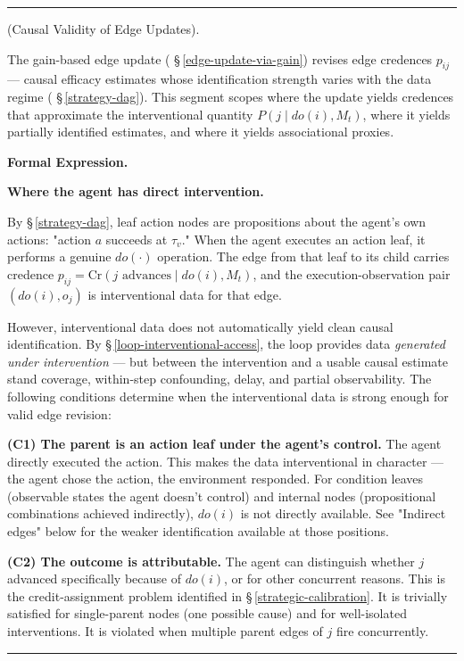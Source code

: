\documentclass[11pt,oneside]{article}
\newcounter{claim}[section]
\renewcommand{\theclaim}{\thesection.\arabic{claim}}
\newenvironment{segment}[2]{%
  \refstepcounter{claim}%
  \bigskip\noindent\hrule\smallskip
  \noindent{\bfseries #1~\theclaim}\enskip(#2).\par\smallskip
  \noindent\ignorespaces
}{%
  \par\smallskip\noindent\hrule\bigskip
}
\newenvironment{scope}[1][]{\begin{segment}{Scope}{#1}}{\end{segment}}
\begin{document}
\begin{scope}[Causal Validity of Edge Updates]
\label{edge-update-causal-validity}
The gain-based edge update ( \S\,\ref{edge-update-via-gain}) revises edge credences $p_{ij}$ --- causal efficacy estimates whose identification strength varies with the data regime ( \S\,\ref{strategy-dag}). This segment scopes where the update yields credences that approximate the interventional quantity $P(j \mid do(i), M_t)$, where it yields partially identified estimates, and where it yields associational proxies.



\medskip\noindent\textbf{Formal Expression.}




\medskip\noindent\textbf{Where the agent has direct intervention.}


By \S\,\ref{strategy-dag}, leaf action nodes are propositions about the agent's own actions: "action $a$ succeeds at $\tau_v$." When the agent executes an action leaf, it performs a genuine $do(\cdot)$ operation. The edge from that leaf to its child carries credence $p_{ij} = \text{Cr}(j \text{ advances} \mid do(i), M_t)$, and the execution-observation pair $(do(i), o_j)$ is interventional data for that edge.

However, interventional data does not automatically yield clean causal identification. By \S\,\ref{loop-interventional-access}, the loop provides data \textit{generated under intervention} — but between the intervention and a usable causal estimate stand coverage, within-step confounding, delay, and partial observability. The following conditions determine when the interventional data is strong enough for valid edge revision:

\textbf{(C1) The parent is an action leaf under the agent's control.} The agent directly executed the action. This makes the data interventional in character — the agent chose the action, the environment responded. For condition leaves (observable states the agent doesn't control) and internal nodes (propositional combinations achieved indirectly), $do(i)$ is not directly available. See "Indirect edges" below for the weaker identification available at those positions.

\textbf{(C2) The outcome is attributable.} The agent can distinguish whether $j$ advanced specifically because of $do(i)$, or for other concurrent reasons. This is the credit-assignment problem identified in \S\,\ref{strategic-calibration}. It is trivially satisfied for single-parent nodes (one possible cause) and for well-isolated interventions. It is violated when multiple parent edges of $j$ fire concurrently.


\end{scope}
\end{document}
